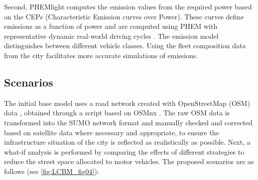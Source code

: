 Second, PHEMlight computes the emission values from the required power based on the CEPs (Characteristic Emission curves over Power). These curves define emissions as a function of power and are computed using PHEM with representative dynamic real-world driving cycles \citep{Bieker2015}. The emission model distinguishes between different vehicle classes. Using the fleet composition data from the city facilitates more accurate simulations of emissions.

\subsection{Scenarios}
\label{subsec:LCBM_2.3_scenarios}

The initial base model uses a road network created with OpenStreetMap (OSM) data \citep{OpenStreetMap}, obtained through a script based on OSMnx \citep{Boeing2017}. The raw OSM data is transformed into the SUMO network format and manually checked and corrected based on satellite data where necessary and appropriate, to ensure the infrastructure situation of the city is reflected as realistically as possible. Next, a what-if analysis is performed by comparing the effects of different strategies to reduce the street space allocated to motor vehicles. The proposed scenarios are as follows (see \cref{fig:LCBM_fig04}):  

